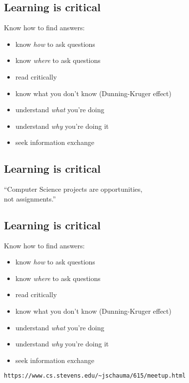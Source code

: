 \documentclass[xga]{xdvislides}
\begin{document}
\subsection{Learning is critical}
Know how to find answers:
\begin{itemize}
	\item know {\em how} to ask questions
	\item know {\em where} to ask questions
	\item read critically
	\item know what you don't know (Dunning-Kruger effect)
	\item understand {\em what} you're doing
	\item understand {\em why} you're doing it
	\item seek information exchange
\end{itemize}

\subsection{Learning is critical}
\vspace{1in}
\Huge
\begin{center}
``Computer Science projects are opportunities, \\
not assignments.'' \\
\end{center}
\Normalsize

\subsection{Learning is critical}
Know how to find answers:
\begin{itemize}
	\item know {\em how} to ask questions
	\item know {\em where} to ask questions
	\item read critically
	\item know what you don't know (Dunning-Kruger effect)
	\item understand {\em what} you're doing
	\item understand {\em why} you're doing it
	\item seek information exchange
\end{itemize}
\vspace{.5in}
\verb+https://www.cs.stevens.edu/~jschauma/615/meetup.html+
\end{document}
